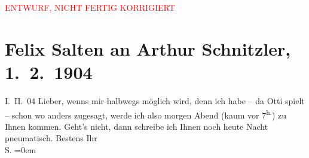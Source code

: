 
\begin{center}
            \textcolor{red}{ENTWURF, NICHT FERTIG KORRIGIERT}
                      \end{center}
            
         
         \renewcommand{\erwaehntePersonen}{Personen: Ottilie Salten}
         \renewcommand{\erwaehnteOrte}{Orte: Wien}
         \renewcommand{\erwaehnteWerke}{}
               \section[Felix Salten an Arthur Schnitzler, 1. 2. 1904]{ Felix Salten an Arthur Schnitzler, 1. 2. 1904}\nopagebreak{}\rehead{ }\begin{ledgroupsized}[t]{13cm}\normalsize\beginnumbering \toendnotes[C]{\smallbreak\pagebreak[2]} 
\pstart
           \raggedleft{}{\pb}I. II. 04\pend
           \pstart
           Lieber, wenns mir halbwegs möglich wird, denn ich habe – da Otti spielt – schon wo anders zugesagt, werde
               ich also morgen Abend (kaum vor 7\textsuperscript{h.}) zu Ihnen kommen. Geht’s nicht, dann schreibe ich Ihnen noch heute Nacht
               pneumatisch. \pend
           \pstart
           Bestens Ihr {\\[\baselineskip]}\spacefill\mbox{S.}\pend
           \leftskip=0em{}
         
         \endnumbering{}\end{ledgroupsized}\begin{anhang}\end{anhang}\newcommand{\dateiname}{L03392}\newcommand{\titel}{Felix Salten an Arthur Schnitzler, 1. 2. 1904}\newcommand{\editorInnen}{Martin Anton Müller und Laura Untner}
      